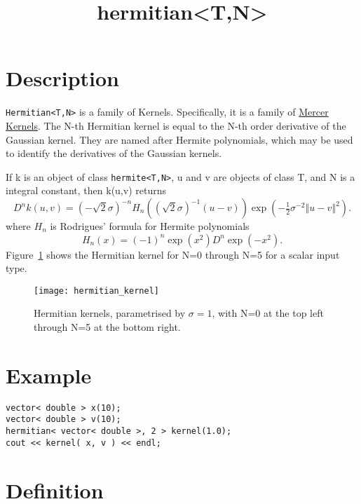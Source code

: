 \documentclass{article}
\newcommand{\half}{\tfrac{1}{2}}
\begin{document}
\title{hermitian<T,N>}
\maketitle

\section*{Description}

\texttt{Hermitian<T,N>} is a family of Kernels. Specifically, it is a family of 
\href{\kmlroot/mercer_kernel.html}{Mercer Kernels}. 
The N-th Hermitian kernel is equal to the N-th order derivative of the Gaussian kernel. 
They are named after Hermite polynomials, which may be used to identify the derivatives of the Gaussian kernels. 

If k is an object of class \texttt{hermite<T,N>}, u and v are objects of class T, and N is a integral constant, then k(u,v) returns
%
\begin{equation}
D^{n}k(u,v)=(-\sqrt{2}\sigma)^{-n}H_{n}((\sqrt{2}\sigma)^{-1}(u-v))\exp(-\half\sigma^{-2}\left\Vert u-v\right\Vert^{2}).
\end{equation}
%
where $H_n$ is Rodrigues' formula for Hermite polynomials
\begin{equation}
H_{n}(x)=(-1)^{n}\exp(x^{2})D^{n}\exp(-x^{2}).
\end{equation}
%
Figure~\ref{figure:hermitian_kernel} shows the Hermitian kernel for N=0 through N=5 for a scalar input type.

\begin{figure}
\texttt{[image: hermitian\_kernel]}
\caption{Hermitian kernels, parametrised by $\sigma=1$, with N=0 at the top left through N=5 at the bottom right.}
\label{figure:hermitian_kernel}
\end{figure}


\section*{Example}


\highlightcpp{}
\begin{verbatim}
vector< double > x(10);
vector< double > v(10);
hermitian< vector< double >, 2 > kernel(1.0);
cout << kernel( x, v ) << endl;
\end{verbatim}


\section*{Definition}
\end{document}
